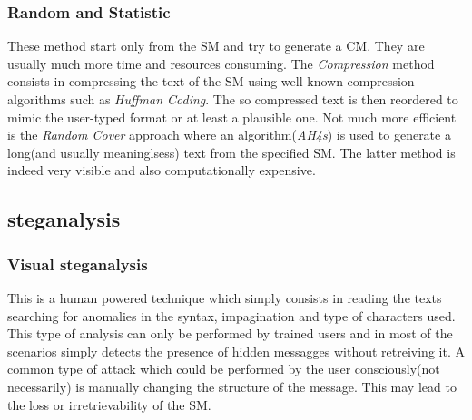 \documentclass[../../main.tex]{subfiles}
\begin{document}
\subsubsection{Random and Statistic}
These method start only from the SM and try to generate a CM.
They are usually much more time and resources consuming.
The \emph{Compression} method consists in compressing the text of the SM
using well known compression algorithms such as \emph{Huffman Coding}.
The so compressed text is then reordered to mimic the user-typed format or
at least a plausible one.
Not much more efficient is the \emph{Random Cover} approach where an
algorithm(\emph{AH4s}) is used to generate a long(and usually meaninglsess)
text from the specified SM.
The latter method is indeed very visible and also computationally expensive.

\subsection{steganalysis}

\subsubsection{Visual steganalysis}
This is a human powered technique which simply consists in reading the texts
searching for anomalies in the syntax, impagination and type of characters
used.
This type of analysis can only be performed by trained users and in most of
the scenarios simply detects the presence of hidden messagges without
retreiving it.
A common type of attack which could be performed by the user consciously(not
necessarily) is manually changing the structure of the message.
This may lead to the loss or irretrievability of the SM.
\end{document}
